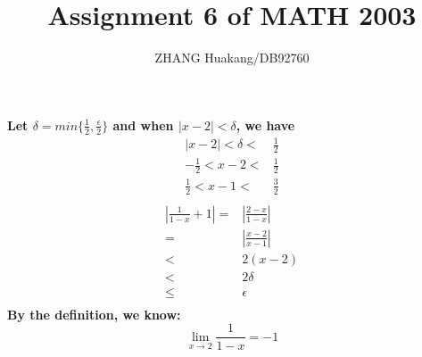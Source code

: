 \documentclass{article}
\title{Assignment 6 of MATH 2003}
\author{ZHANG Huakang/DB92760}
\begin{document}
    \maketitle
    \section{}
        \subsection{}
            \paragraph{
                 Let $\delta=min\{\frac{1}{2},\frac{\epsilon}{2}\}$ and when $|x-2|<\delta$, we have
                 \begin{equation*}
                     \begin{split}
                            |x-2|<\delta<&\frac{1}{2}\\
                            -\frac{1}{2}<x-2<&\frac{1}{2}\\
                            \frac{1}{2}<x-1<&\frac{3}{2}\\
                     \end{split}
                 \end{equation*}
                 \begin{equation*}
                     \begin{split}
                         |\frac{1}{1-x}+1|=&|\frac{2-x}{1-x}|\\
                            =&|\frac{x-2}{x-1}|\\
                            <&2(x-2)\\
                            <&2\delta\\
                            \leq & \epsilon\\
                     \end{split}
                 \end{equation*}
                 By the definition, we know:
                 $$\lim_{x\rightarrow 2}\frac{1}{1-x}=-1$$
            }
        \subsection*{}
\end{document}
